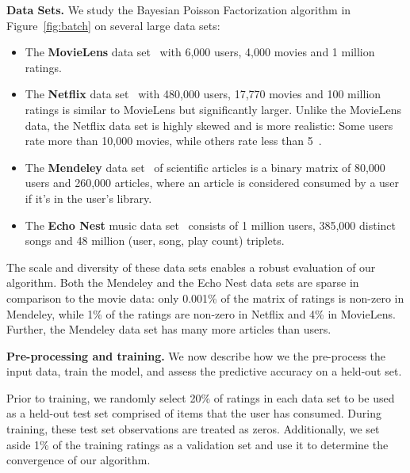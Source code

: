 {\bf Data Sets.} We study the Bayesian Poisson Factorization algorithm
in Figure~\ref{fig:batch} on several large data sets:
\begin{itemize}
\item The {\bf MovieLens} data set~\cite{Herlocker:1999} with 6,000 users, 4,000
  movies and 1 million ratings.
\item The {\bf Netflix} data set~\cite{Koren:2009} with 480,000 users,
  17,770 movies and 100 million ratings is similar to MovieLens but
  significantly larger. Unlike the MovieLens data, the Netflix data
  set is highly skewed and is more realistic: Some users rate more
  than 10,000 movies, while others rate less than
  5~\cite{Salakhutdinov:2008a}.
\item The {\bf Mendeley} data set~\cite{Jack:2010} of scientific
  articles is a binary matrix of
  80,000 users and 260,000 articles, where an article is considered
  consumed by a user if it's in the user's library.
\item The {\bf Echo Nest} music data set~\cite{Bertin-Mahieux:2011} consists of 1
  million users, 385,000 distinct songs and 48 million (user, song,
  play count) triplets.
\end{itemize}

The scale and diversity of these data sets enables a robust evaluation
of our algorithm. Both the Mendeley and the Echo Nest data sets are
sparse in comparison to the movie data: only 0.001\% of the matrix of
ratings is non-zero in Mendeley, while 1\% of the ratings are non-zero
in Netflix and 4\% in MovieLens. Further, the Mendeley data set has
many more articles than users.





{\bf Pre-processing and training.} We now describe how we the
pre-process the input data, train the model, and assess the predictive
accuracy on a held-out set.

Prior to training, we randomly select 20\% of ratings in each data set
to be used as a held-out test set comprised of items that the user
has consumed. During training, these test set observations are treated
as zeros. Additionally, we set aside 1\% of the training ratings as a
validation set and use it to determine the convergence of our
algorithm.

